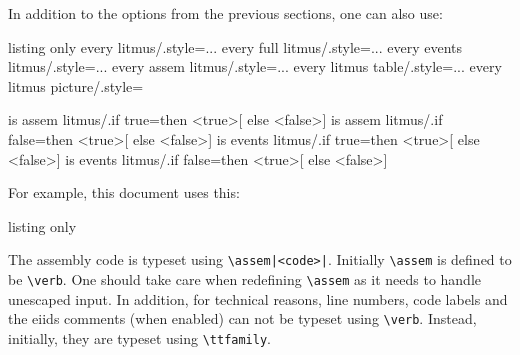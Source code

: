 \documentclass[a4paper]{article}
\begin{document}
In addition to the options from the previous sections, one can also use:
\begin{tcblisting}{listing only}
every litmus/.style={...}
every full litmus/.style={...}
every events litmus/.style={...}
every assem litmus/.style={...}
every litmus table/.style={...}
every litmus picture/.style=

is assem litmus/.if true=then {<true>}[ else {<false>}]
is assem litmus/.if false=then {<true>}[ else {<false>}]
is events litmus/.if true=then {<true>}[ else {<false>}]
is events litmus/.if false=then {<true>}[ else {<false>}]
\end{tcblisting}

For example, this document uses this:
\begin{tcblisting}{listing only}
\newif\ifdrawbox
{}
\end{tcblisting}

\newif\ifdrawbox
{}

The assembly code is typeset using \lstinline+\assem|<code>|+.
Initially \lstinline+\assem+ is defined to be \lstinline+\verb+.
One should take care when redefining \lstinline+\assem+ as it needs
to handle unescaped input. In addition, for technical reasons, line
numbers, code labels and the eiids comments (when enabled) can not be
typeset using \lstinline+\verb+. Instead, initially, they are typeset
using \lstinline+\ttfamily+.
\end{document}
